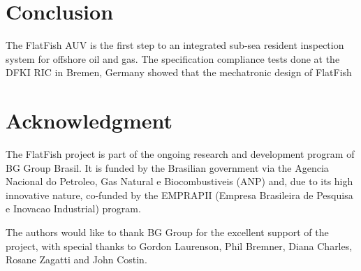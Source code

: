 \documentclass[conference]{IEEEtran}
\begin{document}
\section{Conclusion}

The FlatFish AUV is the first step to an integrated sub-sea resident inspection system for offshore oil and gas. The specification compliance tests done at the DFKI RIC in Bremen, Germany showed that the mechatronic design of FlatFish 






\section*{Acknowledgment}
The FlatFish project is part of the ongoing research and development program of BG Group Brasil. It is funded by the Brasilian government via the Agencia Nacional do Petroleo, Gas Natural e Biocombustiveis (ANP) and, due to its high innovative nature, co-funded by the EMPRAPII (Empresa Brasileira de Pesquisa e Inovacao Industrial) program. 

The authors would like to thank BG Group for the excellent support of the project, with special thanks to Gordon Laurenson, Phil Bremner, Diana Charles, Rosane Zagatti and John Costin.







\end{document}
